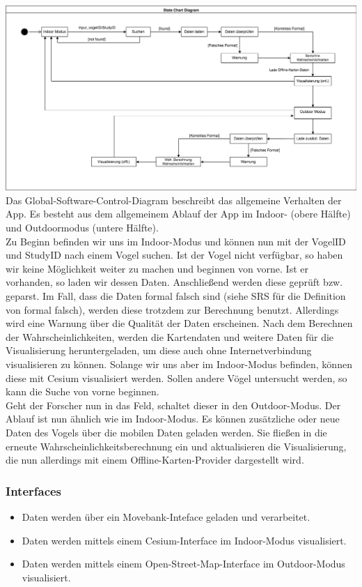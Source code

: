 \documentclass[12pt]{article} %
\begin{document}
\includegraphics[width = \textwidth]{Diagramme/state_diagram.png}
Das Global-Software-Control-Diagram beschreibt das allgemeine Verhalten der App. Es besteht aus dem allgemeinem Ablauf der App im Indoor- (obere Hälfte) und Outdoormodus (untere Hälfte). \\
Zu Beginn befinden wir uns im Indoor-Modus und können nun mit der VogelID und StudyID nach einem Vogel suchen. Ist der Vogel nicht verfügbar, so haben wir keine Möglichkeit weiter zu machen und beginnen von vorne. Ist er vorhanden, so laden wir dessen Daten. Anschließend werden diese geprüft bzw. geparst. Im Fall, dass die Daten formal falsch sind (siehe SRS für die Definition von formal falsch), werden diese trotzdem zur Berechnung benutzt. Allerdings wird eine Warnung über die Qualität der Daten erscheinen. Nach dem Berechnen der Wahrscheinlichkeiten, werden die Kartendaten und weitere Daten für die Visualisierung heruntergeladen, um diese auch ohne Internetverbindung visualisieren zu können. Solange wir uns aber im Indoor-Modus befinden, können diese mit Cesium visualisiert werden. Sollen andere Vögel untersucht werden, so kann die Suche von vorne beginnen. \\
Geht der Forscher nun in das Feld, schaltet dieser in den Outdoor-Modus. Der Ablauf ist nun ähnlich wie im Indoor-Modus. Es können zusätzliche oder neue Daten des Vogels über die mobilen Daten geladen werden. Sie fließen in die erneute Wahrscheinlichkeitsberechnung ein und aktualisieren die Visualisierung, die nun allerdings mit einem Offline-Karten-Provider dargestellt wird. \\



\subsubsection{Interfaces}
\label{sec:interfaces}
\begin{itemize}
	\item Daten werden über ein Movebank-Inteface geladen und verarbeitet. 
	\item Daten werden mittels einem Cesium-Interface im Indoor-Modus visualisiert.
	\item Daten werden mittels einem Open-Street-Map-Interface im Outdoor-Modus visualisiert.

\end{itemize}
\end{document}
